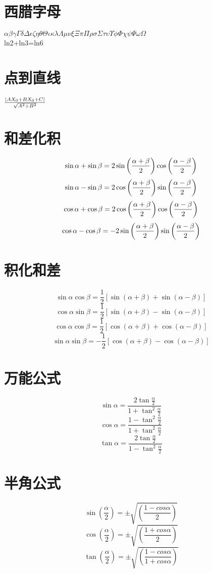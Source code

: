 \documentclass[UTF8]{ctexart}
\begin{document}
\section{西腊字母}
$
\alpha
\beta
\gamma
\Gamma
\delta
\Delta
\epsilon
\zeta
\eta
\theta
\Theta
\iota
\kappa
\lambda
\Lambda
\mu
\nu
\xi
\Xi
\pi
\Pi
\rho
\sigma
\Sigma
\tau
\upsilon
\Upsilon
\phi
\Phi
\chi
\psi
\Psi
\omega
\Omega
$ \\
ln2+ln3=ln6
\section{点到直线}
$ {\left |{AX_0+BX_0+C} \right |} \over \sqrt{A^2+B^2} $

\section{和差化积}
$$ \sin \alpha + \sin \beta = 2 \sin { \left ( {\alpha + \beta } \over 2 \right ) } \cos \left ( {\alpha - \beta } \over 2 \right ) $$
$$\sin \alpha - \sin \beta = 2 \cos { \left ( {\alpha + \beta } \over 2 \right ) } \sin \left ( {\alpha - \beta } \over 2 \right ) $$
$$ \cos \alpha + \cos \beta = 2 \cos { \left ( {\alpha + \beta } \over 2 \right ) } \cos \left ( {\alpha - \beta } \over 2 \right )$$
$$ \cos \alpha - \cos \beta = -2 \sin { \left ( {\alpha + \beta } \over 2 \right ) } \sin \left ( {\alpha - \beta } \over 2 \right )$$

\section{积化和差}
$$ \sin \alpha \cos \beta = \frac{1}{2} \left [ \sin(\alpha+\beta)+\sin(\alpha-\beta) \right ]$$
$$ \cos \alpha \sin \beta = \frac{1}{2} \left [ \sin(\alpha+\beta)-\sin(\alpha-\beta) \right ]$$
$$ \cos \alpha \cos \beta = \frac{1}{2} \left [ \cos(\alpha+\beta)+\cos(\alpha-\beta) \right ]$$
$$ \sin \alpha \sin \beta =- \frac{1}{2} \left [ \cos(\alpha+\beta)-\cos(\alpha-\beta) \right ]$$

\section{万能公式}
$$ \sin\alpha=\frac{2\tan \frac{\alpha}{2}}{1+\tan^2 \frac{\alpha}{2}}$$
$$ \cos \alpha =\frac {1-\tan^2\frac{\alpha}{2}}{1+\tan^2\frac{\alpha}{2}}$$
$$ \tan\alpha=\frac{2\tan \frac{\alpha}{2}}{1-\tan^2 \frac{\alpha}{2}}$$

\section{半角公式}
$$ \sin \left(\frac{\alpha}{2} \right)=\pm \sqrt{\left(\frac{1-cos \alpha}{2}\right)}$$
$$ \cos \left(\frac{\alpha}{2} \right)=\pm \sqrt{\left(\frac{1+cos \alpha}{2}\right)}$$
$$ \tan \left(\frac{\alpha}{2} \right)=\pm \sqrt{\left(\frac{1-cos \alpha}{1+cos \alpha}\right)}$$
\end{document}
